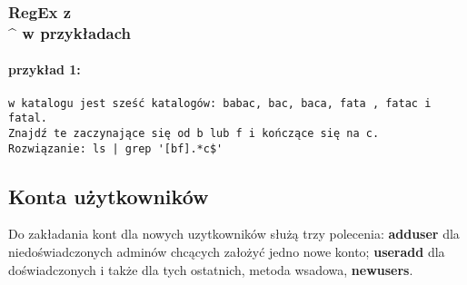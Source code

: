 \documentclass[a4paper,titlepage,12pt]{mwart}
\begin{document}
\subsubsection{RegEx z \\^ w przykładach}
\paragraph{przykład 1:}
\begin{verbatim}
w katalogu jest sześć katalogów: babac, bac, baca, fata , fatac i fatal.
Znajdź te zaczynające się od b lub f i kończące się na c.
Rozwiązanie: ls | grep '[bf].*c$'
\end{verbatim}
\subsection{Konta użytkowników}
Do zakładania kont dla nowych uzytkowników służą trzy polecenia: \textbf{adduser} dla niedoświadczonych adminów chcących założyć jedno nowe konto; \textbf{useradd} dla doświadczonych i także dla tych ostatnich, metoda wsadowa, \textbf{newusers}.
\end{document}
